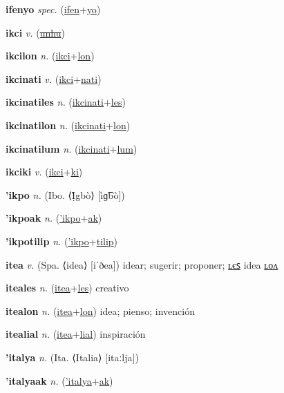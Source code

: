 \textbf{\hypertarget{ifenyo}{ifenyo}} \textit{spec.} (\hyperlink{ifen}{ifen}+\allowbreak \hyperlink{yo}{yo})


\textbf{\hypertarget{ikci}{ikci}} \textit{v.} (\hyperlink{unhu}{\sout{unhu}})


\textbf{\hypertarget{ikcilon}{ikcilon}} \textit{n.} (\hyperlink{ikci}{ikci}+\allowbreak \hyperlink{lon}{lon})


\textbf{\hypertarget{ikcinati}{ikcinati}} \textit{v.} (\hyperlink{ikci}{ikci}+\allowbreak \hyperlink{nati}{nati})


\textbf{\hypertarget{ikcinatiles}{ikcinatiles}} \textit{n.} (\hyperlink{ikcinati}{ikcinati}+\allowbreak \hyperlink{les}{les})


\textbf{\hypertarget{ikcinatilon}{ikcinatilon}} \textit{n.} (\hyperlink{ikcinati}{ikcinati}+\allowbreak \hyperlink{lon}{lon})


\textbf{\hypertarget{ikcinatilum}{ikcinatilum}} \textit{n.} (\hyperlink{ikcinati}{ikcinati}+\allowbreak \hyperlink{lum}{lum})


\textbf{\hypertarget{ikciki}{ikciki}} \textit{v.} (\hyperlink{ikci}{ikci}+\allowbreak \hyperlink{ki}{ki})


\textbf{\hypertarget{'ikpo}{'ikpo}} \textit{n.} (Ibo. ⟨Ị̀gbò⟩ [ìɡ͡bò])


\textbf{\hypertarget{'ikpoak}{'ikpoak}} \textit{n.} (\hyperlink{'ikpo}{'ikpo}+\allowbreak \hyperlink{ak}{ak})


\textbf{\hypertarget{'ikpotilip}{'ikpotilip}} \textit{n.} (\hyperlink{'ikpo}{'ikpo}+\allowbreak \hyperlink{tilip}{tilip})


\textbf{\hypertarget{itea}{itea}} \textit{v.} (Spa. ⟨idea⟩ [iˈðea])
idear; sugerir; proponer; \hyperlink{iteales}{ʟєꜱ} idea \hyperlink{itealon}{ʟᴏᴧ}

\textbf{\hypertarget{iteales}{iteales}} \textit{n.} (\hyperlink{itea}{itea}+\allowbreak \hyperlink{les}{les})
creativo

\textbf{\hypertarget{itealon}{itealon}} \textit{n.} (\hyperlink{itea}{itea}+\allowbreak \hyperlink{lon}{lon})
idea; pienso; invención

\textbf{\hypertarget{itealial}{itealial}} \textit{n.} (\hyperlink{itea}{itea}+\allowbreak \hyperlink{lial}{lial})
inspiración

\textbf{\hypertarget{'italya}{'italya}} \textit{n.} (Ita. ⟨Italia⟩ [itaːlja])


\textbf{\hypertarget{'italyaak}{'italyaak}} \textit{n.} (\hyperlink{'italya}{'italya}+\allowbreak \hyperlink{ak}{ak})


